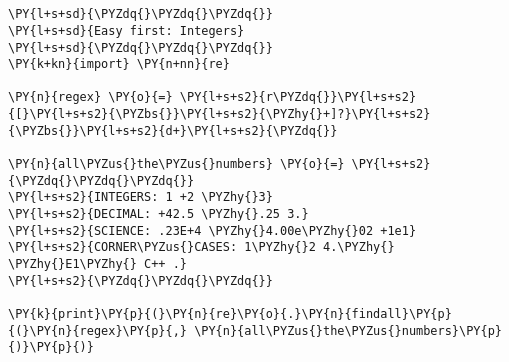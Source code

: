 

\section*{}

\begin{Verbatim}[commandchars=\\\{\}]
\PY{l+s+sd}{\PYZdq{}\PYZdq{}\PYZdq{}}
\PY{l+s+sd}{Easy first: Integers}
\PY{l+s+sd}{\PYZdq{}\PYZdq{}\PYZdq{}}
\PY{k+kn}{import} \PY{n+nn}{re}

\PY{n}{regex} \PY{o}{=} \PY{l+s+s2}{r\PYZdq{}}\PY{l+s+s2}{[}\PY{l+s+s2}{\PYZbs{}}\PY{l+s+s2}{\PYZhy{}+]?}\PY{l+s+s2}{\PYZbs{}}\PY{l+s+s2}{d+}\PY{l+s+s2}{\PYZdq{}}

\PY{n}{all\PYZus{}the\PYZus{}numbers} \PY{o}{=} \PY{l+s+s2}{\PYZdq{}\PYZdq{}\PYZdq{}}
\PY{l+s+s2}{INTEGERS: 1 +2 \PYZhy{}3}
\PY{l+s+s2}{DECIMAL: +42.5 \PYZhy{}.25 3.}
\PY{l+s+s2}{SCIENCE: .23E+4 \PYZhy{}4.00e\PYZhy{}02 +1e1}
\PY{l+s+s2}{CORNER\PYZus{}CASES: 1\PYZhy{}2 4.\PYZhy{} \PYZhy{}E1\PYZhy{} C++ .}
\PY{l+s+s2}{\PYZdq{}\PYZdq{}\PYZdq{}}

\PY{k}{print}\PY{p}{(}\PY{n}{re}\PY{o}{.}\PY{n}{findall}\PY{p}{(}\PY{n}{regex}\PY{p}{,} \PY{n}{all\PYZus{}the\PYZus{}numbers}\PY{p}{)}\PY{p}{)}
\end{Verbatim}

